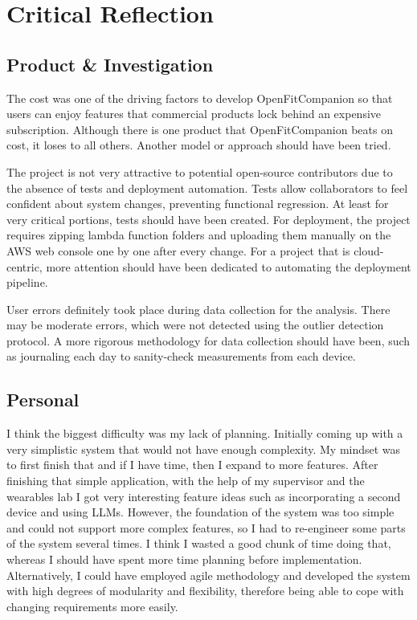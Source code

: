 \section{Critical Reflection}
\subsection{Product \& Investigation}
The cost was one of the driving factors to develop OpenFitCompanion so that users can enjoy features that commercial products lock behind an expensive subscription. Although there is one product that OpenFitCompanion beats on cost, it loses to all others. Another model or approach should have been tried. 

The project is not very attractive to potential open-source contributors due to the absence of tests and deployment automation. Tests allow collaborators to feel confident about system changes, preventing functional regression. At least for very critical portions, tests should have been created. For deployment, the project requires zipping lambda function folders and uploading them manually on the AWS web console one by one after every change. For a project that is cloud-centric, more attention should have been dedicated to automating the deployment pipeline.

User errors definitely took place during data collection for the analysis. There may be moderate errors, which were not detected using the outlier detection protocol. A more rigorous methodology for data collection should have been, such as journaling each day to sanity-check measurements from each device. 
\subsection{Personal}
I think the biggest difficulty was my lack of planning. Initially coming up with a very simplistic system that would not have enough complexity. My mindset was to first finish that and if I have time, then I expand to more features. After finishing that simple application, with the help of my supervisor and the wearables lab I got very interesting feature ideas such as incorporating a second device and using LLMs. However, the foundation of the system was too simple and could not support more complex features, so I had to re-engineer some parts of the system several times. I think I wasted a good chunk of time doing that, whereas I should have spent more time planning before implementation. Alternatively, I could have employed agile methodology and developed the system with high degrees of modularity and flexibility, therefore being able to cope with changing requirements more easily.

